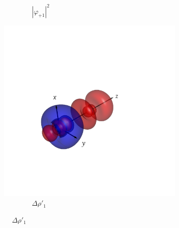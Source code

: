 \documentclass[journal=inoraj,manuscript=article]{achemso}
\begin{document}
\begin{figure}[!h]
\begin{subfigure}[t]{0.32\textwidth}
        \caption*{\ \ \ \ \ \ \ \ $|\varphi_{+1}|^2$} 
    \end{subfigure}
    \hfill
    \begin{subfigure}[t]{0.32\textwidth}
        \centering
        \includegraphics[width=\linewidth]{./AuRn+/pair1.png} 
        \caption*{\ \ \ \ \ \ \ \ $\Delta \rho'_1$} 
    \end{subfigure}


\end{figure}
\end{document}
